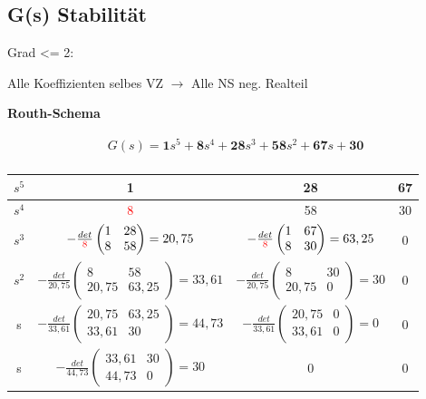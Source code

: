 \documentclass[10pt,a4paper]{article}
\begin{document}
  \subsection{G(s) Stabilität}
  Grad <= 2:
  \begin{mdframed}[style=exercise]
      Alle Koeffizienten selbes VZ $\rightarrow$ Alle NS neg. Realteil
  \end{mdframed}
  \textbf{Routh-Schema}
  \begin{mdframed}[style=exercise]
    \begin{align}
        G(s)=\textbf{1}s^5 + \textbf{8}s^4 + \textbf{28}s^3 + \textbf{58}s^2 + \textbf{67}s + \textbf{30}\\
    \end{align}
  \end{mdframed}
    \begin{center}
    \begin{tabular}{ |c|c|c|c| } 
     \hline
        $s^5$ & 1 & 28 & 67\\ 
     \hline
        $s^4$ & \textcolor{red}{8} & 58 & 30\\ 
     \hline
        $s^3$ & $-\frac{det}{\textcolor{red}{8}} \begin{pmatrix}
            1 & 28 \\
            8 & 58 
        \end{pmatrix} = 20,75$ 
        &  $-\frac{det}{\textcolor{red}{8}} \begin{pmatrix} 
            1 & 67 \\
            8 & 30 
        \end{pmatrix} = 63,25$ 
        & 0\\ 
     \hline
        $s^2$ & $-\frac{det}{20,75} \begin{pmatrix}
            8 & 58 \\
            20,75 & 63,25 
        \end{pmatrix} = 33,61$ 
        &  $-\frac{det}{20,75} \begin{pmatrix} 
            8 & 30 \\
            20,75 & 0 
        \end{pmatrix} = 30$ 
        & 0\\ 
     \hline
        s & $-\frac{det}{33,61} \begin{pmatrix}
            20,75 & 63,25 \\
            33,61 & 30
        \end{pmatrix} = 44,73$ 
         & $-\frac{det}{33,61} \begin{pmatrix}
            20,75 & 0 \\
            33,61 & 0 
        \end{pmatrix} = 0$ 
        & 0\\ 
     \hline
        s & $-\frac{det}{44,73} \begin{pmatrix}
            33,61 & 30\\
            44,73 & 0
        \end{pmatrix} = 30$ 
        & 0
        & 0\\ 
     \hline
    \end{tabular}
    \end{center}
\end{document}
